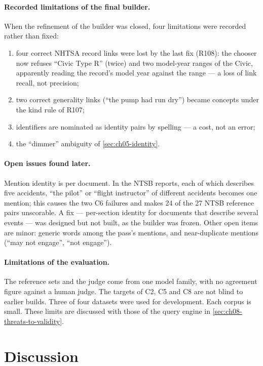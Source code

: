 \paragraph{Recorded limitations of the final builder.} When the refinement of the builder was closed, four
limitations were recorded rather than fixed:
\begin{enumerate}[nosep]
\item four correct NHTSA record links were lost by the last fix (R108): the chooser now refuses ``Civic Type R''
(twice) and two model-year ranges of the Civic, apparently reading the record's model year against the range ---
a loss of link recall, not precision;
\item two correct generality links (``the pump had run dry'') became concepts under the kind rule of R107;
\item identifiers are nominated as identity pairs by spelling --- a cost, not an error;
\item the ``dimmer'' ambiguity of \cref{sec:ch05-identity}.
\end{enumerate}

\paragraph{Open issues found later.} Mention identity is per document. In the NTSB reports, each of which
describes five accidents, ``the pilot'' or ``flight instructor'' of different accidents becomes one mention; this
causes the two C6 failures and makes 24 of the 27 NTSB reference pairs unscorable. A fix --- per-section identity for
documents that describe several events --- was designed but not built, as the builder was frozen. Other open items
are minor: generic words among the pass's mentions, and near-duplicate mentions (``may not engage'', ``not engage'').

\paragraph{Limitations of the evaluation.} The reference sets and the judge come from one model family, with no
agreement figure against a human judge. The targets of C2, C5 and C8 are not blind to earlier builds. Three of four
datasets were used for development. Each corpus is small. These limits are discussed with those of the query
engine in \cref{sec:ch08-threats-to-validity}.

\section{Discussion}\label{sec:ch05-discussion}

